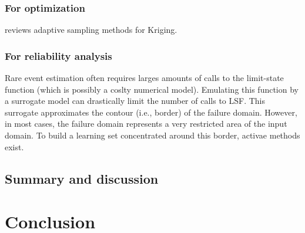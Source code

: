 \subsubsection{For optimization}


\citet{fau_2021} reviews adaptive sampling methods for Kriging.


\subsubsection{For reliability analysis}

Rare event estimation often requires larges amounts of calls to the limit-state function (which is possibly a coslty numerical model). 
Emulating this function by a surrogate model can drastically limit the number of calls to LSF. 
This surrogate approximates the contour (i.e., border) of the failure domain. 
However, in most cases, the failure domain represents a very restricted area of the input domain. 
To build a learning set concentrated around this border, activae methods exist. 




\subsection{Summary and discussion}





\section{Conclusion}


